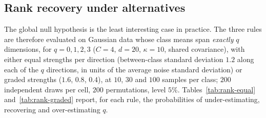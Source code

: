 \documentclass[11pt,a4paper]{article}
\theoremstyle{plain}
\theoremstyle{definition}
\theoremstyle{remark}
\begin{document}
\subsection{Rank recovery under alternatives}
\label{sec:rank-recovery}
The global null hypothesis is the least interesting case in practice. The
three rules are therefore evaluated on Gaussian data whose class means
span \emph{exactly} $q$ dimensions, for $q=0,1,2,3$ ($C=4$, $d=20$,
$\kappa=10$, shared covariance), with either equal strengths per direction
(between-class standard deviation $1.2$ along each of the $q$ directions,
in units of the average noise standard deviation) or graded strengths
($1.6$, $0.8$, $0.4$), at $10$, $30$ and $100$ samples per class; $200$
independent draws per cell, $200$ permutations, level $5\%$.
Tables~\ref{tab:rank-equal} and~\ref{tab:rank-graded} report, for each
rule, the probabilities of under-estimating, recovering and
over-estimating $q$.
\end{document}
